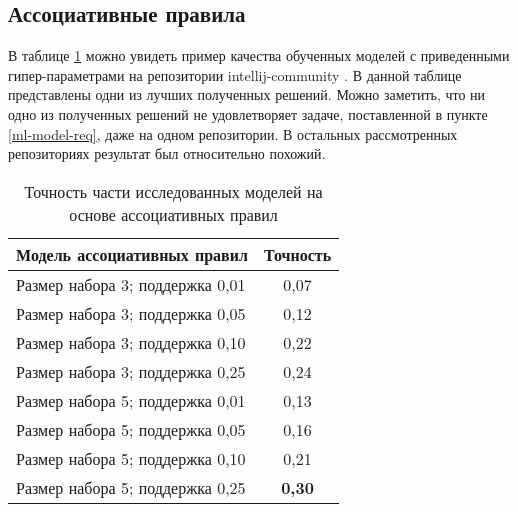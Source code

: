     \subsection{Ассоциативные правила}\label{rules-quality}
В таблице \ref{ar-offline-result-table} можно увидеть пример качества обученных моделей с приведенными гипер-параметрами на репозитории intellij-community \cite{ij-community}. В данной таблице представлены одни из лучших полученных решений. Можно заметить, что ни одно из полученных решений не удовлетворяет задаче, поставленной в пункте \ref{ml-model-req}, даже на одном репозитории. В остальных рассмотренных репозиториях результат был относительно похожий.
        \begin{table}[!h]
        \caption{Точность части исследованных моделей на основе ассоциативных правил}\label{ar-offline-result-table}
        \centering
        \begin{tabular}{|l|c|}\hline
        \multicolumn{1}{|c|}{\textbf{Модель ассоциативных правил}} & \textbf{Точность}\\\hline
        Размер набора 3; поддержка 0,01  & 0,07\\\hline
        Размер набора 3; поддержка 0,05  & 0,12\\\hline
        Размер набора 3; поддержка 0,10  & 0,22\\\hline
        Размер набора 3; поддержка 0,25  & 0,24\\\hline
        Размер набора 5; поддержка 0,01  & 0,13\\\hline
        Размер набора 5; поддержка 0,05  & 0,16\\\hline
        Размер набора 5; поддержка 0,10  & 0,21\\\hline
        Размер набора 5; поддержка 0,25  & \textbf{0,30}\\\hline
        \end{tabular}
        \end{table}
